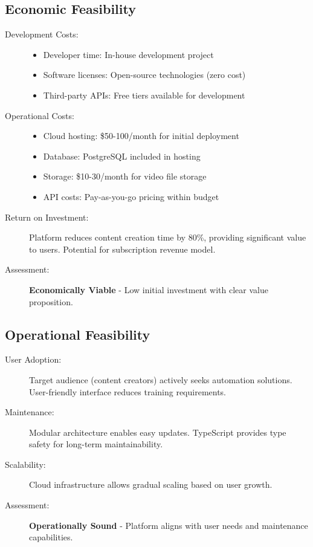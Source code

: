 \subsection{Economic Feasibility}

\begin{description}
    \item[Development Costs:] 
    \begin{itemize}
        \item Developer time: In-house development project
        \item Software licenses: Open-source technologies (zero cost)
        \item Third-party APIs: Free tiers available for development
    \end{itemize}
    
    \item[Operational Costs:]
    \begin{itemize}
        \item Cloud hosting: \$50-100/month for initial deployment
        \item Database: PostgreSQL included in hosting
        \item Storage: \$10-30/month for video file storage
        \item API costs: Pay-as-you-go pricing within budget
    \end{itemize}
    
    \item[Return on Investment:] Platform reduces content creation time by 80\%, providing significant value to users. Potential for subscription revenue model.
    
    \item[Assessment:] \textbf{Economically Viable} - Low initial investment with clear value proposition.
\end{description}

\subsection{Operational Feasibility}

\begin{description}
    \item[User Adoption:] Target audience (content creators) actively seeks automation solutions. User-friendly interface reduces training requirements.
    
    \item[Maintenance:] Modular architecture enables easy updates. TypeScript provides type safety for long-term maintainability.
    
    \item[Scalability:] Cloud infrastructure allows gradual scaling based on user growth.
    
    \item[Assessment:] \textbf{Operationally Sound} - Platform aligns with user needs and maintenance capabilities.
\end{description}

